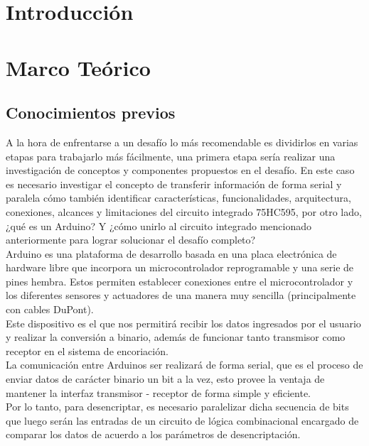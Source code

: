\documentclass{article}
\begin{document}
\section{Introducción}\label{intro}
\section{Marco Teórico}\label{marco}

\subsection{Conocimientos previos}

A la hora de enfrentarse a un desafío lo más recomendable es dividirlos en varias etapas para trabajarlo más fácilmente, una primera etapa sería realizar una investigación de conceptos y componentes propuestos en el desafío. En este caso es necesario investigar el concepto de transferir información de forma serial y paralela cómo también identificar características, funcionalidades, arquitectura, conexiones, alcances y limitaciones del circuito integrado 75HC595, por otro lado, ¿qué es un Arduino? Y ¿cómo unirlo al circuito integrado mencionado anteriormente para lograr solucionar el desafío completo?\\

Arduino es una plataforma de desarrollo basada en una placa electrónica de hardware libre que incorpora un microcontrolador reprogramable  y una serie de pines hembra. Estos permiten establecer conexiones entre el microcontrolador y los diferentes sensores y actuadores de una manera muy sencilla (principalmente con cables DuPont).\cite{arduinowebsite}\\

Este dispositivo es el que nos permitirá recibir los datos ingresados por el usuario y realizar la conversión a binario, además de funcionar tanto transmisor como receptor en el sistema de encoriación.\\

La comunicación entre Arduinos ser realizará de forma serial, que es el proceso de enviar datos de carácter binario un bit a la vez, esto provee la ventaja de mantener la interfaz transmisor - receptor de forma simple y eficiente.\cite{serialsite}\\
Por lo tanto, para desencriptar, es necesario paralelizar dicha secuencia de bits que luego serán las entradas de un circuito de lógica combinacional encargado de comparar los datos de acuerdo a los parámetros de desencriptación.
\end{document}
